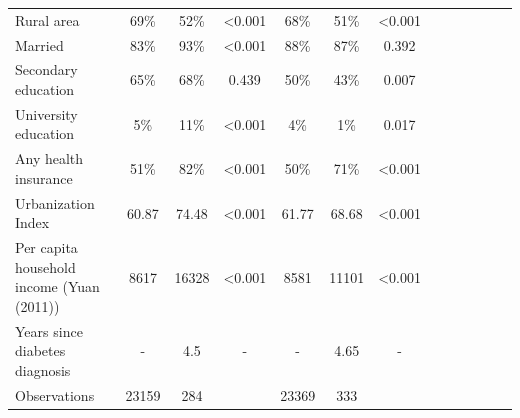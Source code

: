 \begin{landscape}
\begin{table}[p]
\begin{center}
\begin{adjustbox}{max width=\linewidth}
{\begin{tabular}{l*{6}{SS}}
Rural area          &        69\%&       52\%&     <0.001       &        68\%&        51\%&     <0.001       \\
Married             &        83\%&      93\%&     <0.001       &        88\%&        87\%&    0.392        \\
Secondary education     &        65\%&      68\%&   0.439         &        50\%&        43\%&       0.007     \\
University education    &        5\%&      11\%&    <0.001        &        4\%&        1\%&     0.017      \\
Any health insurance&        51\%&     82\%&     <0.001       &        50\%&        71\%&       <0.001      \\
Urbanization Index  &       60.87&     74.48&     <0.001       &       61.77&       68.68&     <0.001       \\
Per capita household income (Yuan (2011))&    8617&     16328&    <0.001        &     8581&     11101&    <0.001        \\
Years since diabetes diagnosis&       -&        4.5&      -      &        -&        4.65&      -      \\
\midrule
Observations        &       23159&         284&       &        23369&         333&            \\
\bottomrule
\end{tabular}
}
\end{adjustbox}
\end{center}
\end{table}
\end{landscape}


